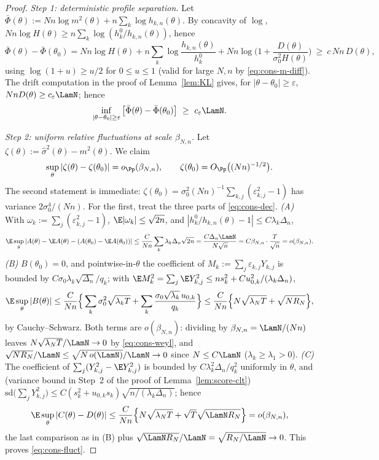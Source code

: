 \begin{proof}
\emph{Step 1: deterministic profile separation.}
Let $\bar\Phi(\theta):=Nn\log m^2(\theta)+n\sum_k\log h_{k,n}(\theta)$. By
concavity of $\log$,
$Nn\log H(\theta)\ge n\sum_k\log(h^0_k/h_{k,n}(\theta))$, hence
\[
 \bar\Phi(\theta)-\bar\Phi(\theta_0)
 =Nn\log H(\theta)+n\sum_k\log\frac{h_{k,n}(\theta)}{h^0_k}
 +Nn\log\Big(1+\frac{D(\theta)}{\sigma_0^2H(\theta)}\Big)
 \ \ge\ c\,Nn\,D(\theta),
\]
using $\log(1+u)\ge u/2$ for $0\le u\le1$ (valid for large $N,n$ by
\eqref{eq:cons-m-diff}). The drift computation in the proof of
Lemma~\ref{lem:KL} gives, for $|\theta-\theta_0|\ge\varepsilon$,
$NnD(\theta)\ge c_\varepsilon\LamN$; hence
\begin{equation}\label{eq:cons-det-sep}
 \inf_{|\theta-\theta_0|\ge\varepsilon}
 \big[\bar\Phi(\theta)-\bar\Phi(\theta_0)\big]
 \ \ge\ c_\varepsilon\LamN .
\end{equation}

\emph{Step 2: uniform relative fluctuations at scale $\beta_{N,n}$.}
Let $\zeta(\theta):=\widehat\sigma^2(\theta)-m^2(\theta)$. We claim
\begin{equation}\label{eq:cons-fluct}
 \sup_\theta|\zeta(\theta)-\zeta(\theta_0)|=o_{\Pp}(\beta_{N,n}),
 \qquad
 \zeta(\theta_0)=O_{\Pp}\big((Nn)^{-1/2}\big).
\end{equation}
The second statement is immediate:
$\zeta(\theta_0)=\sigma_0^2(Nn)^{-1}\sum_{k,j}(\varepsilon_{k,j}^2-1)$ has
variance $2\sigma_0^4/(Nn)$. For the first, treat the three parts of
\eqref{eq:cons-dec}. \emph{(A)} With $\omega_k:=\sum_j(\varepsilon^2_{k,j}-1)$,
$\E|\omega_k|\le\sqrt{2n}$, and
$|h^0_k/h_{k,n}(\theta)-1|\le C\lambda_k\Delta_n$,
\[
 \E\sup_\theta|A(\theta)-\E A(\theta)-(A(\theta_0)-\E A(\theta_0))|
 \le\frac{C}{Nn}\sum_k\lambda_k\Delta_n\sqrt{2n}
 =\frac{C\Delta_n\LamN}{N\sqrt n}
 =C\beta_{N,n}\cdot\frac{T}{\sqrt n}=o(\beta_{N,n}).
\]
\emph{(B)} $B(\theta_0)=0$, and pointwise-in-$\theta$ the coefficient of
$M_k:=\sum_j\varepsilon_{k,j}Y_{k,j}$ is bounded by
$C\sigma_0\lambda_k\sqrt{\Delta_n}/q_k$; with
$\E M_k^2=\sum_j\E Y^2_{k,j}\le ns_k^2+Cu_{0,k}^2/(\lambda_k\Delta_n)$,
\[
 \E\sup_\theta|B(\theta)|
 \le\frac{C}{Nn}\Big\{\sum_k\sigma_0^2\sqrt{\lambda_kT}
 +\sum_k\frac{\sigma_0\sqrt{\lambda_k}\,u_{0,k}}{q_k}\Big\}
 \le\frac{C}{Nn}\Big\{N\sqrt{\lambda_NT}+\sqrt{N R_N}\Big\},
\]
by Cauchy--Schwarz. Both terms are $o(\beta_{N,n})$: dividing by
$\beta_{N,n}=\LamN/(Nn)$ leaves $N\sqrt{\lambda_NT}/\LamN\to0$ by
\eqref{eq:cons-weyl}, and
$\sqrt{NR_N}/\LamN\le\sqrt{N\,o(\LamN)}/\LamN\to0$ since
$N\le C\LamN$ ($\lambda_k\ge\lambda_1>0$).
\emph{(C)} The coefficient of $\sum_j(Y^2_{k,j}-\E Y^2_{k,j})$ is bounded by
$C\lambda_k^2\Delta_n/q_k^2$ uniformly in $\theta$, and (variance bound in Step~2 of the proof of Lemma~\ref{lem:score-clt})
$\mathrm{sd}\big(\sum_j Y^2_{k,j}\big)
\le C(s_k^2+u_{0,k}s_k)\sqrt{n/(\lambda_k\Delta_n)}$; hence
\[
 \E\sup_\theta|C(\theta)-D(\theta)|
 \le\frac{C}{Nn}\Big\{N\sqrt{\lambda_NT}
 +\sqrt T\sqrt{\LamN R_N}\Big\}=o(\beta_{N,n}),
\]
the last comparison as in (B) plus $\sqrt{\LamN R_N}/\LamN=\sqrt{R_N/\LamN}\to0$.
This proves \eqref{eq:cons-fluct}.


\end{proof}
